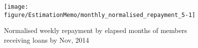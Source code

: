 \begin{Schunk}
\begin{figure}

{\centering \texttt{[image: figure/EstimationMemo/monthly\_normalised\_repayment\_5-1]} 

}

\caption[Normalised weekly repayment by elapsed months of members receiving loans by Nov, 2014]{Normalised weekly repayment by elapsed months of members receiving loans by Nov, 2014}\label{Figure monthly normalised repayment 5}
\end{figure}
\end{Schunk}
\begin{comment}
\begin{itemize}
\vspace{1.0ex}\setlength{\itemsep}{1.0ex}\setlength{\baselineskip}{12pt}
\item	{\small \textsc{Figures} \ref{Figure monthly normalised repayment}, \ref{Figure monthly normalised repayment 2}} show poor loan repayment discipline. The dots in the figures are monthly repayment amount of each members divided with the number of weeks of each month, which I call as normalised weekly repayment. The normalised weekly repayment may not be exactly the same as the average of actual repayment because number of weekly meetings can differ from number of weeks, depending on the day of week. However, it should be correct on average.
\item	The fixed installment amount is 125 for traditional, large, 190 for large with grace, packaged as indicated by horizontal green lines. 
\item	The bottom panel in {\small \textsc{Figures} \ref{Figure monthly normalised repayment}} shows ratio of zero repayment incidence to total repayment opportunities, averaged by month. There are many nonrepayment incidence especially in 2014 when the flood hit the area.
\item	Most borrowers repay a large amount at the end of the lending cycle, which suggests sales of assets or incurring a new debt.
\end{itemize}
Cumulative repayment rates.
\end{comment}



